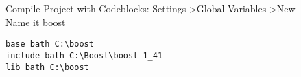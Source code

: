 %
%
%
Compile Project with Codeblocks:
Settings->Global Variables->New\\
Name it boost
\begin{verbatim}
base bath C:\boost
include bath C:\Boost\boost-1_41
lib bath C:\boost
\end{verbatim}
%
